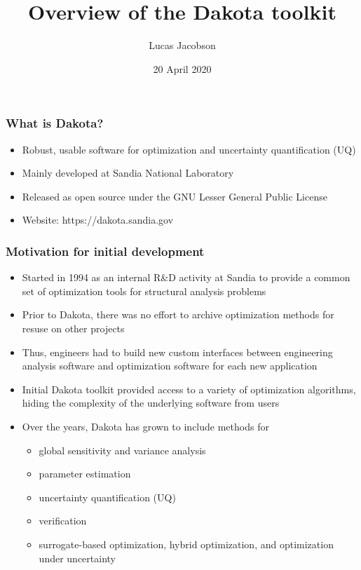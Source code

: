 \documentclass[t]{beamer}
\title{Overview of the Dakota toolkit}
\author{Lucas Jacobson}
\institute{University of Wisconsin--Madison}
\date{20 April 2020}
\begin{document}

\begin{frame}
  \titlepage
\end{frame}


\begin{frame}
  \frametitle{What is Dakota?}
  \begin{itemize}
    \item Robust, usable software for optimization and uncertainty
          quantification (UQ)
    \item Mainly developed at Sandia National Laboratory
    \item Released as open source under the GNU Lesser General Public License
    \item Website: https://dakota.sandia.gov
  \end{itemize}
\end{frame}


\begin{frame}
  \frametitle{Motivation for initial development}
  \begin{itemize}
    \item Started in 1994 as an internal R\&D activity at Sandia to provide a
          common set of optimization tools for structural analysis problems
    \item Prior to Dakota, there was no effort to archive optimization methods
          for resuse on other projects
    \item Thus, engineers had to build new custom interfaces between engineering
          analysis software and optimization software for each new application
    \item Initial Dakota toolkit provided access to a variety of optimization
          algorithms, hiding the complexity of the underlying software from
          users
    \item Over the years, Dakota has grown to include methods for
    \begin{itemize}
      \item global sensitivity and variance analysis
      \item parameter estimation
      \item uncertainty quantification (UQ)
      \item verification
      \item surrogate-based optimization, hybrid optimization, and optimization
            under uncertainty
    \end{itemize}
  \end{itemize}
\end{frame}
\end{document}
